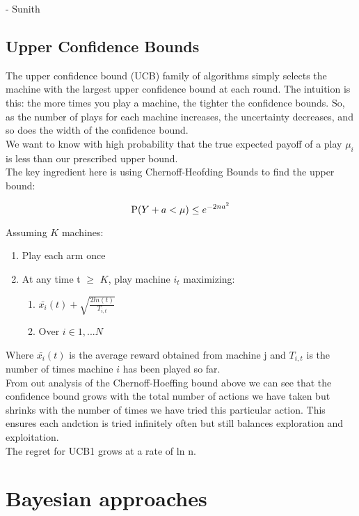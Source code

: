 \documentclass{article}
\begin{document}
- Sunith

\subsection{Upper Confidence Bounds}

The upper confidence bound (UCB) family of algorithms simply selects the machine with the largest upper confidence bound at each round.  The intuition is this: the more times you play a machine, the tighter the confidence bounds. So, as the number of plays for each machine increases, the uncertainty decreases, and so does the width of the confidence bound.\\

We want to know with high probability that the true expected payoff of a play $\mu_i$ is less than our prescribed upper bound.\\

The key ingredient here is using Chernoff-Heofding Bounds to find the upper bound:

$$\displaystyle \textup{P}(Y + a < \mu) \leq e^{-2na^2}$$

Assuming $K$ machines:

\begin{enumerate}
\item Play each arm once
\item At any time t $\ge$ $K$, play machine $i_t$ maximizing:
	\begin{enumerate}
		\item $\bar{x_{i}}(t) + \sqrt{\frac{2 ln (t)}{T_{i,t}}}$
		\item Over $i \in {1,...N}$ 
	\end{enumerate}
\end{enumerate}

Where $\bar{x_{i}}(t)$ is the average reward obtained from machine j and $T_{i,t}$ is the number of times machine $i$ has been played so far.\\

From out analysis of the Chernoff-Hoeffing bound above we can see that the confidence bound grows with the total number of actions we have taken but shrinks with the number of times we have tried this particular action. This ensures each andction is tried infinitely often but still balances exploration and exploitation.\\

The regret for UCB1 grows at a rate of ln n.\\

\section{Bayesian approaches}
\end{document}
